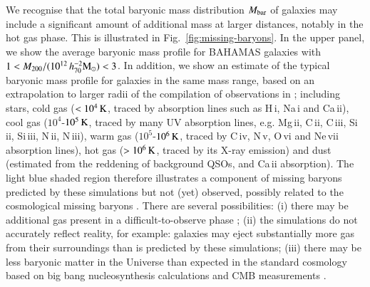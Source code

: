 \documentclass{aa}
\newcommand{\hmsun}{\,h_{70}^{-2} {\rm M_\odot}}
\newcommand{\un}[1]{_{\rm #1}}
\begin{document}
We recognise that the total baryonic mass distribution $M\un{bar}$ of galaxies may include a significant amount of additional mass at larger distances, notably in the hot gas phase. This is illustrated in Fig.~\ref{fig:missing-baryons}. In the upper panel, we show the average baryonic mass profile for BAHAMAS galaxies with $1<M_{200}/(10^{12}\hmsun)<3$. In addition, we show an estimate of the typical baryonic mass profile for galaxies in the same mass range, based on an extrapolation to larger radii of the compilation of observations in \citet{tumlinson2017}; including stars, cold gas ($<10^4\,{\rm K}$, traced by absorption lines such as H\,{\sc i}, Na\,{\sc i} and Ca\,{\sc ii}), cool gas ($10^4$-$10^5\,{\rm K}$, traced by many UV absorption lines, e.g. Mg\,{\sc ii}, C\,{\sc ii}, C\,{\sc iii}, Si\,{\sc ii}, Si\,{\sc iii}, N\,{\sc ii}, N\,{\sc iii}), warm gas ($10^5$-$10^6\,{\rm K}$, traced by C\,{\sc iv}, N\,{\sc v}, O\,{\sc vi} and Ne\,{\sc vii} absorption lines), hot gas ($>10^6\,{\rm K}$, traced by its X-ray emission) and dust (estimated from the reddening of background QSOs, and Ca\,{\sc ii} absorption). The light blue shaded region therefore illustrates a component of missing baryons predicted by these simulations but not (yet) observed, possibly related to the cosmological missing baryons \citep[e.g.][]{fukugita1998,fukugita2004,shull2012}. There are several possibilities: (i) there may be additional gas present in a difficult-to-observe phase \citep[e.g. hot, low-density gas, see for instance][]{nicastro2018}; (ii) the simulations do not accurately reflect reality, for example: galaxies may eject substantially more gas from their surroundings than is predicted by these simulations; (iii) there may be less baryonic matter in the Universe than expected in the standard cosmology based on big bang nucleosynthesis \cite[BBN;][]{kirkman2003} calculations and CMB measurements \cite[]{spergel2003,planck2014}.
\end{document}
